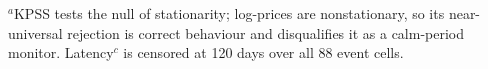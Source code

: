 $^a$KPSS tests the null of stationarity; log-prices are nonstationary, so its near-universal rejection is correct behaviour and disqualifies it as a calm-period monitor. Latency$^c$ is censored at 120 days over all 88 event cells.
